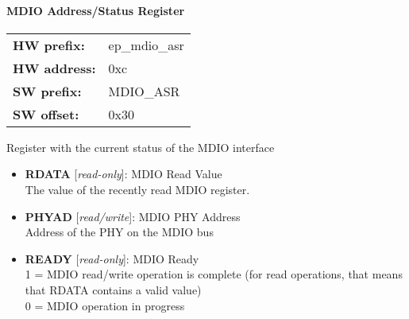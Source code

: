 \paragraph*{MDIO Address/Status Register}\vspace{12pt}

\begin{tabular}{l l }
{\bf HW prefix:}  & ep\_mdio\_asr\\
{\bf HW address:}  & 0xc\\
{\bf SW prefix:}  & MDIO\_ASR\\
{\bf SW offset:}  & 0x30\\
\end{tabular}

\vspace{12pt}
Register with the current status of the MDIO interface

\vspace{12pt}
\noindent
{}

\begin{itemize}
\item \begin{small}
{\bf 
RDATA
} [\emph{read-only}]: MDIO Read Value
\\
The value of the recently read MDIO register.
\end{small}
\item \begin{small}
{\bf 
PHYAD
} [\emph{read/write}]: MDIO PHY Address
\\
Address of the PHY on the MDIO bus
\end{small}
\item \begin{small}
{\bf 
READY
} [\emph{read-only}]: MDIO Ready
\\
1 = MDIO read/write operation is complete (for read operations, that means that RDATA contains a valid value)\\				                0 = MDIO operation in progress
\end{small}
\end{itemize}
